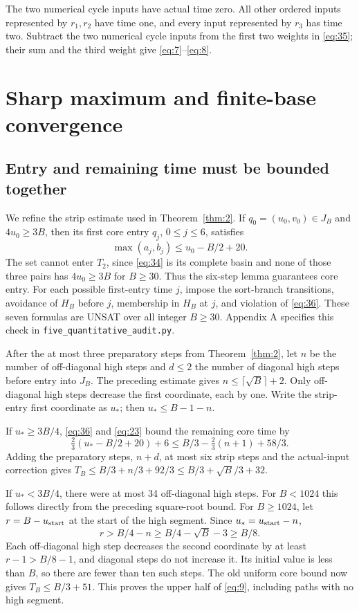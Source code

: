 \documentclass[11pt]{amsart}
\begin{document}
The two numerical cycle inputs have actual time zero. All other ordered inputs represented by \(r_1,r_2\) have time one, and every input represented by \(r_3\) has time two. Subtract the two numerical cycle inputs from the first two weights in \eqref{eq:35}; their sum and the third weight give \eqref{eq:7}--\eqref{eq:8}.

\section{Sharp maximum and finite-base convergence}

\subsection{Entry and remaining time must be bounded together}

We refine the strip estimate used in Theorem~\ref{thm:2}. If \(q_0=(u_0,v_0)\in J_B\) and \(4u_0\ge3B\), then its first core entry \(q_j\), \(0\le j\le6\), satisfies \begin{equation}\label{eq:36}
\max(a_j,b_j)\le u_0-B/2+20.
\end{equation} The set cannot enter \(T_2\), since \eqref{eq:34} is its complete basin and none of those three pairs has \(4u_0\ge3B\) for \(B\ge30\). Thus the six-step lemma guarantees core entry. For each possible first-entry time \(j\), impose the sort-branch transitions, avoidance of \(H_B\) before \(j\), membership in \(H_B\) at \(j\), and violation of \eqref{eq:36}. These seven formulas are UNSAT over all integer \(B\ge30\). Appendix A specifies this check in \texttt{five\_quantitative\_audit.py}.

After the at most three preparatory steps from Theorem~\ref{thm:2}, let \(n\) be the number of off-diagonal high steps and \(d\le2\) the number of diagonal high steps before entry into \(J_B\). The preceding estimate gives \(n\le\lceil\sqrt B\rceil+2\). Only off-diagonal high steps decrease the first coordinate, each by one. Write the strip-entry first coordinate as \(u_*\); then \(u_*\le B-1-n\).

If \(u_*\ge3B/4\), \eqref{eq:36} and \eqref{eq:23} bound the remaining core time by \[\tfrac23(u_*-B/2+20)+6
 \le B/3-\tfrac23(n+1)+58/3.\] Adding the preparatory steps, \(n+d\), at most six strip steps and the actual-input correction gives \(T_B\le B/3+n/3+92/3\le B/3+\sqrt B/3+32\).

If \(u_*<3B/4\), there were at most 34 off-diagonal high steps. For \(B<1024\) this follows directly from the preceding square-root bound. For \(B\ge1024\), let \(r=B-u_{\rm start}\) at the start of the high segment. Since \(u_*=u_{\rm start}-n\), \[r>B/4-n\ge B/4-\sqrt B-3\ge B/8.\] Each off-diagonal high step decreases the second coordinate by at least \(r-1>B/8-1\), and diagonal steps do not increase it. Its initial value is less than \(B\), so there are fewer than ten such steps. The old uniform core bound now gives \(T_B\le B/3+51\). This proves the upper half of \eqref{eq:9}, including paths with no high segment.
\end{document}

